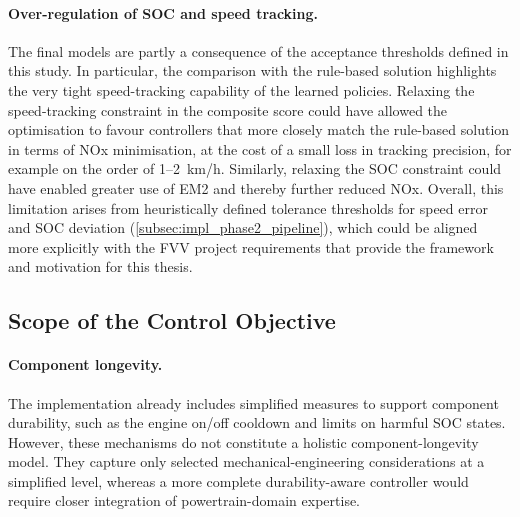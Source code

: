 \paragraph{Over-regulation of \ac{SOC} and speed tracking.} The final models are partly a consequence of the acceptance thresholds defined in this study. In particular, the comparison with the rule-based solution highlights the very tight speed-tracking capability of the learned policies. Relaxing the speed-tracking constraint in the composite score could have allowed the optimisation to favour controllers that more closely match the rule-based solution in terms of \ac{NOx} minimisation, at the cost of a small loss in tracking precision, for example on the order of 1--2~km/h. Similarly, relaxing the \ac{SOC} constraint could have enabled greater use of \ac{EM2} and thereby further reduced \ac{NOx}. Overall, this limitation arises from heuristically defined tolerance thresholds for speed error and \ac{SOC} deviation (\autoref{subsec:impl_phase2_pipeline}), which could be aligned more explicitly with the \ac{FVV} project requirements that provide the framework and motivation for this thesis.

\subsection{Scope of the Control Objective}

\paragraph{Component longevity.} The implementation already includes simplified measures to support component durability, such as the engine on/off cooldown and limits on harmful \ac{SOC} states. However, these mechanisms do not constitute a holistic component-longevity model. They capture only selected mechanical-engineering considerations at a simplified level, whereas a more complete durability-aware controller would require closer integration of powertrain-domain expertise.

